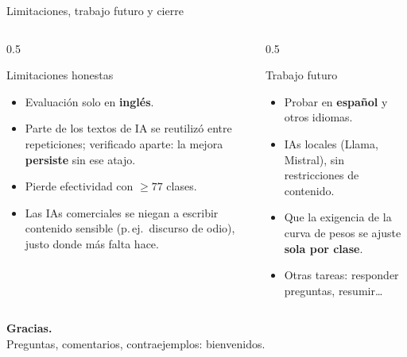 \begin{frame}{Limitaciones, trabajo futuro y cierre}
\small
\begin{columns}[T]

\begin{column}{0.5\textwidth}
\begin{block}{Limitaciones honestas}
\scriptsize
\begin{itemize}\setlength\itemsep{0pt}
  \item Evaluación solo en \textbf{inglés}.
  \item Parte de los textos de IA se reutilizó entre repeticiones; verificado aparte: la mejora \textbf{persiste} sin ese atajo.
  \item Pierde efectividad con $\geq 77$ clases.
  \item Las IAs comerciales se niegan a escribir contenido sensible (p.\,ej.\ discurso de odio), justo donde más falta hace.
\end{itemize}
\end{block}
\end{column}

\begin{column}{0.5\textwidth}
\begin{block}{Trabajo futuro}
\scriptsize
\begin{itemize}\setlength\itemsep{0pt}
  \item Probar en \textbf{español} y otros idiomas.
  \item IAs locales (Llama, Mistral), sin restricciones de contenido.
  \item Que la exigencia de la curva de pesos se ajuste \textbf{sola por clase}.
  \item Otras tareas: responder preguntas, resumir\dots
\end{itemize}
\end{block}
\end{column}

\end{columns}

\vspace{0.6em}
\begin{center}
\begin{tcolorbox}[colback=uaibluedark, colframe=uaibluedark, coltext=white,
                  width=0.85\linewidth, halign=center, arc=4pt]
\textbf{Gracias.}\\[0.2em]
{\small Preguntas, comentarios, contraejemplos: bienvenidos.}
\end{tcolorbox}
\end{center}
\end{frame}

